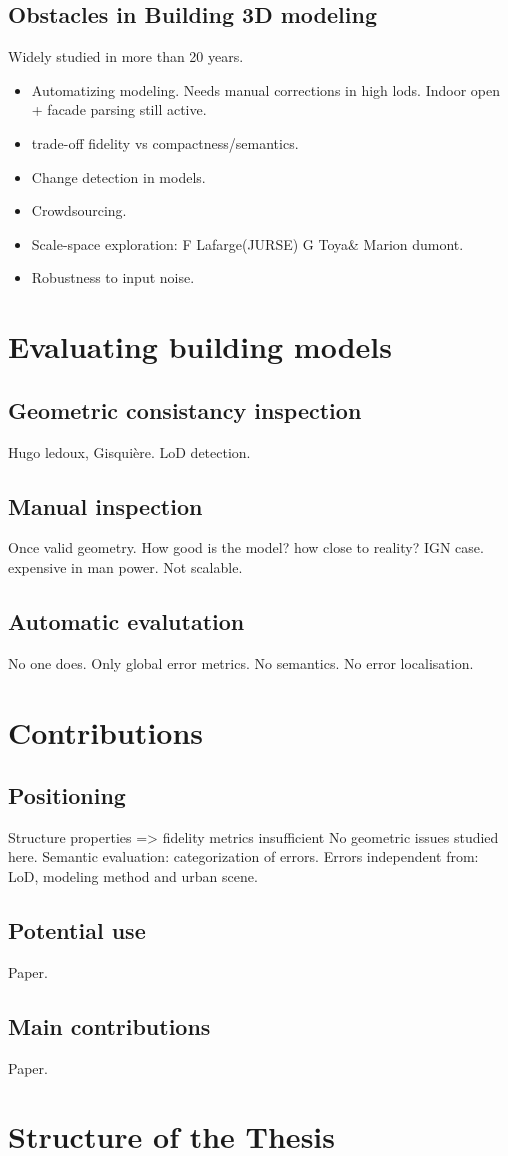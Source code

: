     \subsection{Obstacles in Building 3D modeling}
        Widely studied in more than 20 years.\\
        \begin{itemize}
            \item Automatizing modeling. Needs manual corrections in high lods. Indoor open + facade parsing still active.
            \item trade-off fidelity vs compactness/semantics.
            \item Change detection in models.
            \item Crowdsourcing.
            \item Scale-space exploration: F Lafarge(JURSE) G Toya\& Marion dumont.
            \item Robustness to input noise.
        \end{itemize}
\section{Evaluating building models}
    \subsection{Geometric consistancy inspection}
        Hugo ledoux, Gisquière. LoD detection.
    \subsection{Manual inspection}
        Once valid geometry. How good is the model? how close to reality?
        IGN case.
        expensive in man power. Not scalable.
    \subsection{Automatic evalutation}
        No one does. Only global error metrics. No semantics. No error localisation.
\section{Contributions}
    \subsection{Positioning}
        Structure properties => fidelity metrics insufficient
        No geometric issues studied here.
        Semantic evaluation: categorization of errors.
        Errors independent from: LoD, modeling method and urban scene.
    \subsection{Potential use}
        Paper.
    \subsection{Main contributions}
        Paper.
\section{Structure of the Thesis}
